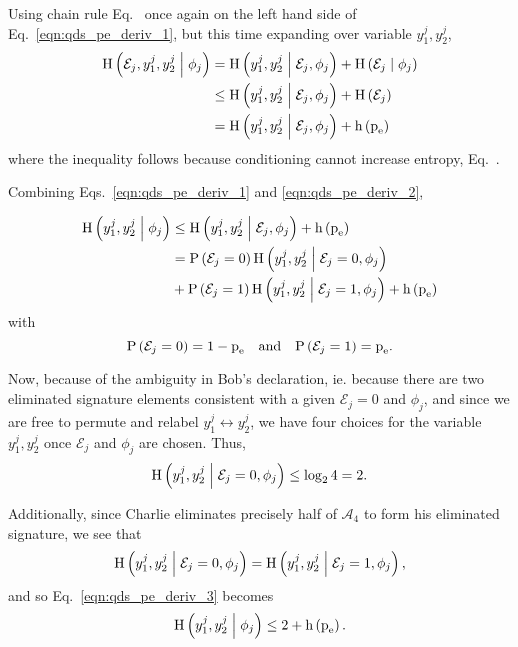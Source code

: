 \noindent Using chain rule Eq.~ once again on the left hand side of Eq.~\ref{eqn:qds_pe_deriv_1}, but this time expanding over variable $y_1^j, y_2^j$,
\begin{align}\label{eqn:qds_pe_deriv_2}
\text{H}\left( \mathcal{E}_j, y_1^j, y_2^j \; \middle| \; \phi_j \right) &=
\text{H}\left(y_1^j, y_2^j \; \middle| \; \mathcal{E}_j, \phi_j\right) + \text{H}\left(\mathcal{E}_j \; \middle| \; \phi_j\right) \notag \\
&\le \text{H}\left(y_1^j, y_2^j \; \middle| \; \mathcal{E}_j, \phi_j\right) + \text{H}\left(\mathcal{E}_j\right) \notag \\
&= \text{H}\left(y_1^j, y_2^j \; \middle| \; \mathcal{E}_j, \phi_j\right) + \text{h}\left(\text{p}_{\text{e}}\right)
\end{align}
where the inequality follows because conditioning cannot increase entropy, Eq.~.

Combining Eqs.~\ref{eqn:qds_pe_deriv_1} and \ref{eqn:qds_pe_deriv_2},

\begin{align}\label{eqn:qds_pe_deriv_3}
\text{H}\left(y_1^j, y_2^j \; \middle| \; \phi_j\right) &\le \text{H}\left(y_1^j, y_2^j \; \middle| \; \mathcal{E}_j, \phi_j\right) + \text{h}\left(\text{p}_{\text{e}}\right) \notag \\
&= \text{P}\left(\mathcal{E}_j=0\right) \text{H}\left(y_1^j, y_2^j \; \middle| \; \mathcal{E}_j=0, \phi_j\right) \notag \\
&+ \text{P}\left(\mathcal{E}_j=1\right) \text{H}\left(y_1^j, y_2^j \; \middle| \; \mathcal{E}_j=1, \phi_j\right) + \text{h}\left(\text{p}_{\text{e}}\right)
\end{align}
with
\begin{equation}
\text{P}\left(\mathcal{E}_j=0\right) = 1 - \pe \qq{and} \text{P}\left(\mathcal{E}_j=1\right) = \pe.
\end{equation}

\noindent Now, because of the ambiguity in Bob's declaration, ie. because there are two eliminated signature elements consistent with a given $\mathcal{E}_j=0$ and $\phi_j$, and since we are free to permute and relabel $y_1^j \leftrightarrow y_2^j$, we have four choices for the variable $y_1^j, y_2^j$ once $\mathcal{E}_j$ and $\phi_j$ are chosen. Thus,
\begin{equation}
\text{H}\left(y_1^j, y_2^j \; \middle| \; \mathcal{E}_j=0, \phi_j\right) \le \log_2 4 = 2.
\end{equation}

\noindent Additionally, since Charlie eliminates precisely half of $\mathcal{A}_4$ to form his eliminated signature, we see that
\begin{equation}
\text{H}\left(y_1^j, y_2^j \; \middle| \; \mathcal{E}_j=0, \phi_j\right) = \text{H}\left(y_1^j, y_2^j \; \middle| \; \mathcal{E}_j=1, \phi_j\right),
\end{equation}
and so Eq.~\ref{eqn:qds_pe_deriv_3} becomes
\begin{equation}\label{eqn:qds_pe_deriv_4}
\text{H}\left(y_1^j, y_2^j \; \middle| \; \phi_j\right) \le 2 + \text{h}\left(\text{p}_{\text{e}}\right).
\end{equation}

